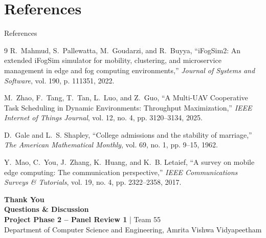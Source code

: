 \documentclass[aspectratio=169, 11pt]{beamer}
\begin{document}
\section{References}
\begin{frame}{References}
    \footnotesize
    \begin{thebibliography}{9}
        R.~Mahmud, S.~Pallewatta, M.~Goudarzi, and R.~Buyya, 
        \newblock ``iFogSim2: An extended iFogSim simulator for mobility, clustering, and microservice management in edge and fog computing environments,'' 
        \newblock \emph{Journal of Systems and Software}, vol. 190, p. 111351, 2022.

        M.~Zhao, F.~Tang, T.~Tan, L.~Luo, and Z.~Guo, 
        \newblock ``A Multi-UAV Cooperative Task Scheduling in Dynamic Environments: Throughput Maximization,'' 
        \newblock \emph{IEEE Internet of Things Journal}, vol. 12, no. 4, pp. 3120--3134, 2025.

        D.~Gale and L.~S. Shapley, 
        \newblock ``College admissions and the stability of marriage,'' 
        \newblock \emph{The American Mathematical Monthly}, vol. 69, no. 1, pp. 9--15, 1962.

        Y.~Mao, C.~You, J.~Zhang, K.~Huang, and K.~B. Letaief, 
        \newblock ``A survey on mobile edge computing: The communication perspective,'' 
        \newblock \emph{IEEE Communications Surveys \& Tutorials}, vol. 19, no. 4, pp. 2322--2358, 2017.
    \end{thebibliography}
\end{frame}

\begin{frame}
    \centering    
    \vspace{0.8cm}
    {\Huge \textbf{\textcolor{amritaMaroon}{Thank You}}} \\
    \vspace{0.4cm}
    {\large \textbf{Questions \& Discussion}} \\
    \vspace{0.3cm}
    {\footnotesize \textbf{Project Phase 2 -- Panel Review 1} \quad | \quad Team 55} \\
    \vspace{0.2cm}
    {\scriptsize Department of Computer Science and Engineering, Amrita Vishwa Vidyapeetham}
\end{frame}
\end{document}
